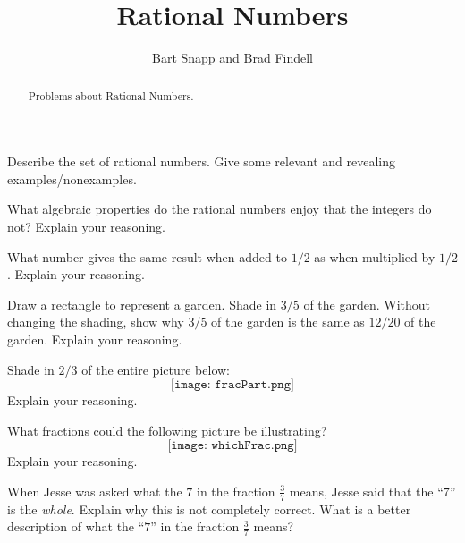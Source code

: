 \documentclass[nooutcomes]{ximera}
\title{Rational Numbers}
\author{Bart Snapp and Brad Findell}
\begin{document}
\begin{abstract}
Problems about Rational Numbers.
\end{abstract}
\maketitle





\begin{problem}
Describe the set of rational numbers. Give some relevant and
  revealing examples/nonexamples.
\end{problem}

\begin{problem}
What algebraic properties do the rational numbers enjoy that the
  integers do not? Explain your reasoning.
\end{problem}

\begin{problem}
What number gives the same result when added to $1/2$ as when
  multiplied by $1/2$. Explain your reasoning.
\end{problem}

\begin{problem}
Draw a rectangle to represent a garden. Shade in $3/5$ of the
  garden. Without changing the shading, show why $3/5$ of the garden
  is the same as $12/20$ of the garden. Explain your reasoning.
\end{problem}

\begin{problem}
Shade in $2/3$ of the entire picture below:
\[
\texttt{[image: fracPart.png]}
\]
Explain your reasoning.
\end{problem}

\begin{problem}
What fractions could the following picture be illustrating?
\[
\texttt{[image: whichFrac.png]}
\]
Explain your reasoning.
\end{problem}

\begin{problem}
When Jesse was asked what the $7$ in the fraction $\frac{3}{7}$
  means, Jesse said that the ``$7$'' is the \textit{whole}. Explain
  why this is not completely correct. What is a better description of
  what the ``$7$'' in the fraction $\frac{3}{7}$ means?

\end{problem}
\end{document}
